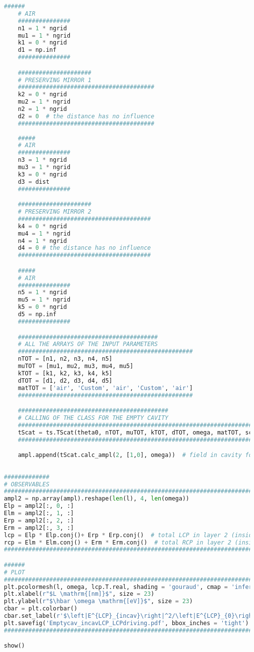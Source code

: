 \documentclass[showpacs,aps,prl,onecolumn,superscriptaddress]{revtex4-1}
\begin{document}
\begin{lstlisting}[language=Python, caption=Script for Figure \ref{LCPlcp}]
    ######
    # AIR
    ###############
    n1 = 1 * ngrid
    mu1 = 1 * ngrid
    k1 = 0 * ngrid
    d1 = np.inf
    ###############

    #####################
    # PRESERVING MIRROR 1
    #######################################
    k2 = 0 * ngrid
    mu2 = 1 * ngrid
    n2 = 1 * ngrid
    d2 = 0  # the distance has no influence
    #######################################
    
    #####
    # AIR 
    ###############
    n3 = 1 * ngrid
    mu3 = 1 * ngrid
    k3 = 0 * ngrid
    d3 = dist
    ###############

    #####################
    # PRESERVING MIRROR 2
    ######################################
    k4 = 0 * ngrid
    mu4 = 1 * ngrid
    n4 = 1 * ngrid
    d4 = 0 # the distance has no influence
    ######################################  

    #####
    # AIR
    ###############
    n5 = 1 * ngrid
    mu5 = 1 * ngrid
    k5 = 0 * ngrid
    d5 = np.inf
    ###############

    ########################################
    # ALL THE ARRAYS OF THE INPUT PARAMETERS
    ##################################################
    nTOT = [n1, n2, n3, n4, n5] 
    muTOT = [mu1, mu2, mu3, mu4, mu5]
    kTOT = [k1, k2, k3, k4, k5] 
    dTOT = [d1, d2, d3, d4, d5] 
    matTOT = ['air', 'Custom', 'air', 'Custom', 'air']
    ##################################################

    ###########################################
    # CALLING OF THE CLASS FOR THE EMPTY CAVITY
    #########################################################################
    tScat = ts.TScat(theta0, nTOT, muTOT, kTOT, dTOT, omega, matTOT, scatTOT)  
    #########################################################################

    ampl.append(tScat.calc_ampl(2, [1,0], omega))  # field in cavity for an incoming LCP wave
    
    
#############
# OBSERVABLES
#####################################################################################    
ampl2 = np.array(ampl).reshape(len(l), 4, len(omega))       
Elp = ampl2[:, 0, :]
Elm = ampl2[:, 1, :]
Erp = ampl2[:, 2, :]
Erm = ampl2[:, 3, :]
lcp = Elp * Elp.conj()+ Erp * Erp.conj()  # total LCP in layer 2 (inside the cavity)
rcp = Elm * Elm.conj() + Erm * Erm.conj()  # total RCP in layer 2 (inside the cavity)
#####################################################################################

######
# PLOT
#####################################################################################
plt.pcolormesh(l, omega, lcp.T.real, shading = 'gouraud', cmap = 'inferno', norm=mcolors.LogNorm()) 
plt.xlabel(r"$L \mathrm{[nm]}$", size = 23)
plt.ylabel(r"$\hbar \omega \mathrm{[eV]}$", size = 23)
cbar = plt.colorbar()
cbar.set_label(r'$\left|E^{LCP}_{incav}\right|^2/\left|E^{LCP}_{0}\right|^2$', labelpad = -10, y = 1.1, rotation = 0, size = 14)
plt.savefig('Emptycav_incavLCP_LCPdriving.pdf', bbox_inches = 'tight')
######################################################################################

show()
\end{lstlisting}
\end{document}
